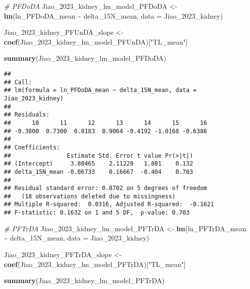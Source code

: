 \documentclass[
]{article}
\newenvironment{Shaded}{\begin{snugshade}}{\end{snugshade}}
\newcommand{\AttributeTok}[1]{\textcolor[rgb]{0.13,0.29,0.53}{#1}}
\newcommand{\CommentTok}[1]{\textcolor[rgb]{0.56,0.35,0.01}{\textit{#1}}}
\newcommand{\FunctionTok}[1]{\textcolor[rgb]{0.13,0.29,0.53}{\textbf{#1}}}
\newcommand{\NormalTok}[1]{#1}
\newcommand{\OtherTok}[1]{\textcolor[rgb]{0.56,0.35,0.01}{#1}}
\newcommand{\SpecialCharTok}[1]{\textcolor[rgb]{0.81,0.36,0.00}{\textbf{#1}}}
\newcommand{\StringTok}[1]{\textcolor[rgb]{0.31,0.60,0.02}{#1}}
\begin{document}
\begin{Shaded}
\begin{Highlighting}[]
\CommentTok{\# PFDoDA}
\NormalTok{Jiao\_2023\_kidney\_lm\_model\_PFDoDA }\OtherTok{\textless{}{-}} \FunctionTok{lm}\NormalTok{(ln\_PFDoDA\_mean }\SpecialCharTok{\textasciitilde{}}\NormalTok{ delta\_15N\_mean,}
                                    \AttributeTok{data =}\NormalTok{ Jiao\_2023\_kidney)}

\NormalTok{Jiao\_2023\_kidney\_PFUnDA\_slope }\OtherTok{\textless{}{-}} \FunctionTok{coef}\NormalTok{(Jiao\_2023\_kidney\_lm\_model\_PFUnDA)[}\StringTok{"TL\_mean"}\NormalTok{]}

\FunctionTok{summary}\NormalTok{(Jiao\_2023\_kidney\_lm\_model\_PFDoDA)}
\end{Highlighting}
\end{Shaded}

\begin{verbatim}
## 
## Call:
## lm(formula = ln_PFDoDA_mean ~ delta_15N_mean, data = Jiao_2023_kidney)
## 
## Residuals:
##      10      11      12      13      14      15      16 
## -0.3800  0.7300  0.8183  0.9064 -0.4192 -1.0168 -0.6386 
## 
## Coefficients:
##                Estimate Std. Error t value Pr(>|t|)
## (Intercept)     3.80465    2.11220   1.801    0.132
## delta_15N_mean -0.06733    0.16667  -0.404    0.703
## 
## Residual standard error: 0.8702 on 5 degrees of freedom
##   (18 observations deleted due to missingness)
## Multiple R-squared:  0.0316, Adjusted R-squared:  -0.1621 
## F-statistic: 0.1632 on 1 and 5 DF,  p-value: 0.703
\end{verbatim}

\begin{Shaded}
\begin{Highlighting}[]
\CommentTok{\# PFTrDA}
\NormalTok{Jiao\_2023\_kidney\_lm\_model\_PFTrDA }\OtherTok{\textless{}{-}} \FunctionTok{lm}\NormalTok{(ln\_PFTrDA\_mean }\SpecialCharTok{\textasciitilde{}}\NormalTok{ delta\_15N\_mean,}
                                    \AttributeTok{data =}\NormalTok{ Jiao\_2023\_kidney)}

\NormalTok{Jiao\_2023\_kidney\_PFTrDA\_slope }\OtherTok{\textless{}{-}} \FunctionTok{coef}\NormalTok{(Jiao\_2023\_kidney\_lm\_model\_PFTrDA)[}\StringTok{"TL\_mean"}\NormalTok{]}

\FunctionTok{summary}\NormalTok{(Jiao\_2023\_kidney\_lm\_model\_PFTrDA)}
\end{Highlighting}
\end{Shaded}
\end{document}
